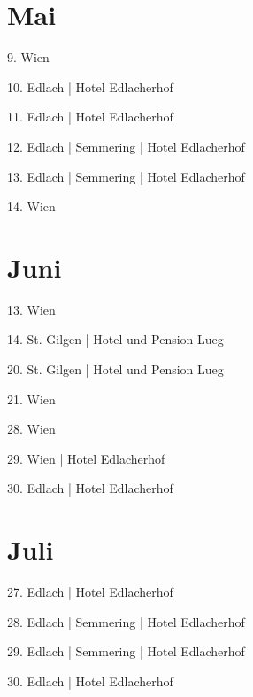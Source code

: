 \documentclass[twoside=false,titlepage=false,open=any, parskip=never, fontsize=10pt, headings=small, chapterprefix=false, appendixprefix=false, DIV=15]{scrbook}
\begin{document}
\begin{multicols}{3}
            \section*{Mai}
            9. Wien\par
            10. Edlach | Hotel Edlacherhof\par
            11. Edlach | Hotel Edlacherhof\par
            12. Edlach | Semmering | Hotel Edlacherhof\par
            13. Edlach | Semmering | Hotel Edlacherhof\par
            14. Wien\par
            \section*{Juni}
            13. Wien\par
            14. St. Gilgen | Hotel und Pension Lueg\par
            20. St. Gilgen | Hotel und Pension Lueg\par
            21. Wien\par
            28. Wien\par
            29. Wien | Hotel Edlacherhof\par
            30. Edlach | Hotel Edlacherhof\par
            \section*{Juli}
            27. Edlach | Hotel Edlacherhof\par
            28. Edlach | Semmering | Hotel Edlacherhof\par
            29. Edlach | Semmering | Hotel Edlacherhof\par
            30. Edlach | Hotel Edlacherhof\par

\end{multicols}
\end{document}
